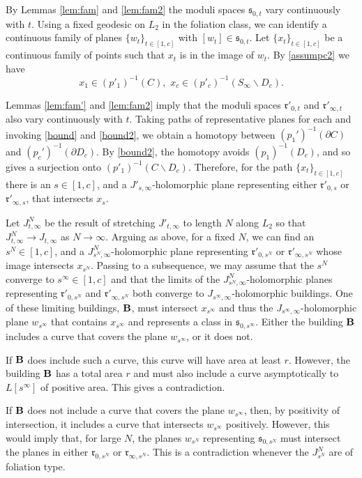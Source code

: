 \documentclass[12pt]{amsart}
\theoremstyle{definition}
\begin{document}
By Lemmas \ref{lem:fam} and \ref{lem:fam2} the moduli spaces $\mathfrak{s}_{0,t}$ vary continuously with $t$. Using a fixed geodesic on $L_2$ in the foliation class, we can identify a continuous family of planes $\{w_t\}_{t \in [1,c]}$ with $[w_t] \in  \mathfrak{s}_{0,t}$. Let $\{ x_t \}_{t \in [1,c]}$ be a continuous family of points such that $x_t$ is in the image of $ w_t$. By \eqref{assumpc2} we have $$x_1 \in (p'_1)^{-1}(C), \, \, x_c \in (p'_c)^{-1}(S_{\infty} \smallsetminus D_c).$$


Lemmas \ref{lem:fam'} and \ref{lem:fam2} imply that the moduli spaces $\mathfrak{r}'_{0,t}$ and $\mathfrak{r}'_{\infty,t}$ also vary continuously with $t$. Taking paths of representative planes for each and invoking  \eqref{bound} and \eqref{bound2}, we obtain a homotopy between $(p_1')^{-1}(\partial C)$ and $(p_c')^{-1}(\partial D_{c})$. By \eqref{bound2}, the homotopy avoids $(p_1)^{-1}(D_c)$, and so gives a surjection onto $(p'_1)^{-1}(C \smallsetminus D_c)$. Therefore, for the path $\{ x_t \}_{t \in [1,c]}$ there is an $s \in [1,c]$, and a $J'_{s, \infty}$-holomorphic plane representing either $\mathfrak{r}'_{0, s}$ or $\mathfrak{r}'_{\infty, s}$, that intersects $x_s$.


Let $J^N_{t, \infty}$ be the result of stretching $J'_{t, \infty}$ to length $N$ along $L_2$ so that $J^N_{t, \infty} \to J_{t,\infty}$ as $N \to \infty$. Arguing as above, for a fixed $N$, we can find an $s^N \in [1,c]$, and a $J^N_{s^N, \infty}$-holomorphic plane representing  $\mathfrak{r}'_{0, s^N}$ or $\mathfrak{r}'_{\infty, s^N}$ whose image intersects $x_{s^N}$. Passing to a subsequence, we may assume that the $s^N$ converge to $s^{\infty} \in [1,c]$ and that the limits of the $J^N_{s^N, \infty}$-holomorphic planes representing  $\mathfrak{r}'_{0, s^N}$ and $\mathfrak{r}'_{\infty, s^N}$ both converge to $J_{s^{\infty}, \infty}$-holomorphic buildings. One of these limiting buildings, $\bf{B}$, must intersect $x_{s^{\infty}}$ and thus the $J_{s^{\infty}, \infty}$-holomorphic plane $w_{s^{\infty}}$ that contains $x_{s^{\infty}}$ and represents a class in $\mathfrak{s}_{0,s^\infty}$. Either the building $\bf{B}$ includes a curve that covers the plane $w_{s^{\infty}}$, or it does not.

If $\bf{B}$ does include such a curve, this curve will have area at least $r$. However, the building $\bf{B}$ has a total area $r$ and must also include a curve asymptotically to $L[{s^{\infty}}]$ of positive area. This gives a contradiction.

If $\bf{B}$ does not include a curve that covers the plane $w_{s^{\infty}}$, then, by positivity of intersection, it includes a curve that intersects $w_{s^{\infty}}$ positively. However, this would imply that, for large $N$, the planes $w_{s^N}$ representing $\mathfrak{s}_{0,s^N}$  must intersect the planes in either $\mathfrak{r}_{0, s^N}$ or $\mathfrak{r}_{\infty, s^N}$. This is a contradiction whenever the $J^N_{s^N}$ are of foliation type.
\end{document}
